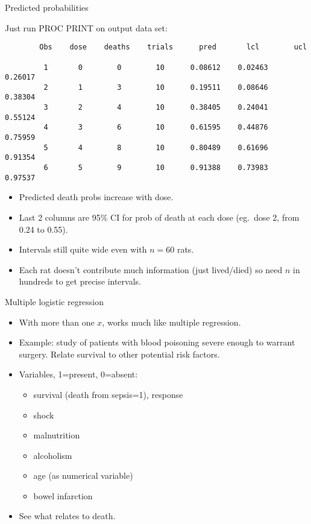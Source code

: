 \documentclass[pdf]{prosper}
\begin{document}
\begin{slide}{Predicted probabilities}

Just run PROC PRINT on output data set:

{\scriptsize
\begin{verbatim}
        Obs    dose    deaths    trials      pred       lcl        ucl

         1       0        0        10      0.08612    0.02463    0.26017
         2       1        3        10      0.19511    0.08646    0.38304
         3       2        4        10      0.38405    0.24041    0.55124
         4       3        6        10      0.61595    0.44876    0.75959
         5       4        8        10      0.80489    0.61696    0.91354
         6       5        9        10      0.91388    0.73983    0.97537

\end{verbatim}
}

\begin{itemize}
\item Predicted death probs increase with dose.
\item Last 2 columns are 95\% CI for prob of death at each dose (eg.\ dose 2, from 0.24 to 0.55).
\item Intervals still quite wide even with $n=60$ rats.
\item Each rat doesn't contribute much information (just lived/died) so need $n$ in hundreds to get precise intervals.
\end{itemize}

  
\end{slide}

\begin{slide}{Multiple logistic regression}

  \begin{itemize}
  \item With more than one $x$, works much like multiple regression.
  \item Example: study of patients with blood poisoning severe enough to warrant surgery. Relate survival to other potential risk factors.
  \item Variables, 1=present, 0=absent:
    \begin{itemize}
    \item survival (death from sepsis=1), response
    \item shock
    \item malnutrition
    \item alcoholism
    \item age (as numerical variable)
    \item bowel infarction
    \end{itemize}
  \item See what relates to death.
  \end{itemize}


  
\end{slide}
\end{document}

